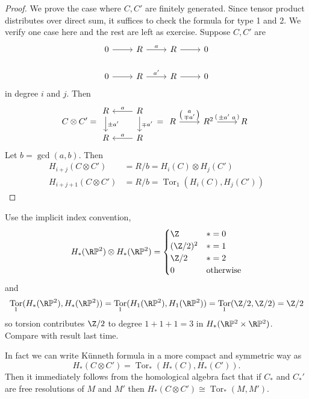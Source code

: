 \documentclass[a4paper]{article}
\renewcommand*{\P}{\mathbb{P}}
\DeclareMathOperator{\Tor}{Tor} %
\begin{document}
\begin{proof}
  We prove the case where \(C, C'\) are finitely generated. Since tensor product distributes over direct sum, it suffices to check the formula for type 1 and 2. We verify one case here and the rest are left as exercise. Suppose \(C, C'\) are
  \[
    \begin{tikzcd}
      0 \ar[r] & R \ar[r, "a"] & R \ar[r] & 0 \\
      0 \ar[r] & R \ar[r, "a'"] & R \ar[r] & 0
    \end{tikzcd}
  \]
  in degree \(i\) and \(j\). Then
  \[
    C \otimes C' =
    \begin{tikzcd}
      R \ar[d, "\pm a'"] & R \ar[d, "\mp a'"] \ar[l, "a"'] \\
      R & R \ar[l, "a"']
    \end{tikzcd}
    =
    \begin{tikzcd}[ampersand replacement=\&]
      R \ar[r, "\begin{psmallmatrix} a \\ \mp a' \end{psmallmatrix}"] \& R^2 \ar[r, "{\begin{psmallmatrix} \pm a' & a \end{psmallmatrix}}"] \& R
    \end{tikzcd}
  \]
  Let \(b = \gcd(a, b)\). Then
  \begin{align*}
    H_{i + j}(C \otimes C') &= R/b = H_i(C) \otimes H_j(C') \\
    H_{i + j + 1}(C \otimes C') &= R/b = \Tor_1(H_i(C), H_j(C'))
  \end{align*}
\end{proof}

\begin{eg}
  Use the implicit index convention,
  \[
    H_*(\R\P^2) \otimes H_*(\R\P^2) =
    \begin{cases}
      \Z & * = 0 \\
      (\Z/2)^2 & * = 1 \\
      \Z/2 & * = 2 \\
      0 & \text{otherwise}
    \end{cases}
  \]
  and
  \[
    \Tor_1(H_*(\R\P^2), H_*(\R\P^2))
    = \Tor_1(H_1(\R\P^2), H_1(\R\P^2))
    = \Tor_1(\Z/2, \Z/2)
    = \Z/2
  \]
  so torsion contributes \(\Z/2\) to degree \(1 + 1 + 1 = 3\) in \(H_*(\R\P^2 \times \R\P^2)\). Compare with result last time.
\end{eg}

In fact we can write Künneth formula in a more compact and symmetric way as
\[
  H_*(C \otimes C') = \Tor_*(H_*(C), H_*(C')).
\]
Then it immediately follows from the homological algebra fact that if \(C_*\) and \(C_*'\) are free resolutions of \(M\) and \(M'\) then \(H_*(C \otimes C') \cong \Tor_*(M, M')\).
\end{document}
